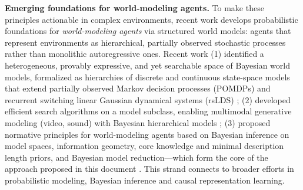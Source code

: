 \documentclass[11pt,letterpaper]{article}
\begin{document}
\textbf{Emerging foundations for world-modeling agents.}
To make these principles actionable in complex environments, recent work develops probabilistic foundations for \emph{world-modeling agents} via structured world models: agents that represent environments as hierarchical, partially observed stochastic processes rather than monolithic autoregressive ones. Recent work (1) identified a heterogeneous, provably expressive, and yet searchable space of Bayesian world models, formalized as hierarchies of discrete and continuous state-space models that extend partially observed Markov decision processes (POMDPs) and recurrent switching linear Gaussian dynamical systems (rsLDS) \cite{da_costa_toward_2024,da_costa_natural_2025}; (2) developed efficient search algorithms on a model subclass, enabling multimodal generative modeling (video, sound) with Bayesian hierarchical models \cite{friston_pixels_2024}; (3) proposed normative principles for world-modeling agents based on Bayesian inference on model spaces, information geometry, core knowledge and minimal description length priors, and Bayesian model reduction---which form the core of the approach proposed in this document \cite{dacostaPossiblePrinciplesAligned2025}.
This strand connects to broader efforts in probabilistic modeling, Bayesian inference and causal representation learning.



\end{document}

